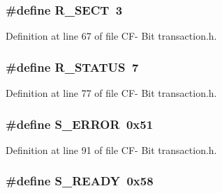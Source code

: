 \subsubsection[{R\+\_\+\+S\+E\+C\+T}]{\setlength{\rightskip}{0pt plus 5cm}\#define R\+\_\+\+S\+E\+C\+T~3}\label{_c_f-_01_bit_01transaction_8h_a2d8f9df446db95fd0706bf4ec03414c7}


Definition at line 67 of file C\+F-\/ Bit transaction.\+h.

\hypertarget{_c_f-_01_bit_01transaction_8h_aef698ae444239bc08e1975c5dfd9dbe0}{}
\subsubsection[{R\+\_\+\+S\+T\+A\+T\+U\+S}]{\setlength{\rightskip}{0pt plus 5cm}\#define R\+\_\+\+S\+T\+A\+T\+U\+S~7}\label{_c_f-_01_bit_01transaction_8h_aef698ae444239bc08e1975c5dfd9dbe0}


Definition at line 77 of file C\+F-\/ Bit transaction.\+h.

\hypertarget{_c_f-_01_bit_01transaction_8h_af6e8cab5d0642b96ef462156816c3a28}{}
\subsubsection[{S\+\_\+\+E\+R\+R\+O\+R}]{\setlength{\rightskip}{0pt plus 5cm}\#define S\+\_\+\+E\+R\+R\+O\+R~0x51}\label{_c_f-_01_bit_01transaction_8h_af6e8cab5d0642b96ef462156816c3a28}


Definition at line 91 of file C\+F-\/ Bit transaction.\+h.

\hypertarget{_c_f-_01_bit_01transaction_8h_ae4b94c0e1e132ec39bb713033cf9c91d}{}
\subsubsection[{S\+\_\+\+R\+E\+A\+D\+Y}]{\setlength{\rightskip}{0pt plus 5cm}\#define S\+\_\+\+R\+E\+A\+D\+Y~0x58}\label{_c_f-_01_bit_01transaction_8h_ae4b94c0e1e132ec39bb713033cf9c91d}


